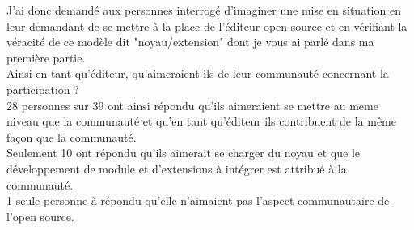 			J'ai donc demandé aux personnes interrogé d'imaginer une mise en situation en leur demandant de se mettre à la place de l'éditeur open source et en vérifiant la véracité de ce modèle dit "noyau/extension" dont je vous ai parlé dans ma première partie.\\

			Ainsi en tant qu'éditeur, qu'aimeraient-ils de leur communauté concernant la participation ?\\

			28 personnes sur 39 ont ainsi répondu qu'ils aimeraient se mettre au meme niveau que la communauté et qu'en tant qu'éditeur ils contribuent de la même façon que la communauté.\\

			Seulement 10 ont répondu qu'ils aimerait se charger du noyau et que le développement de module et d'extensions à intégrer est attribué à la communauté.\\

			1 seule personne à répondu qu'elle n'aimaient pas l'aspect communautaire de l'open source.

